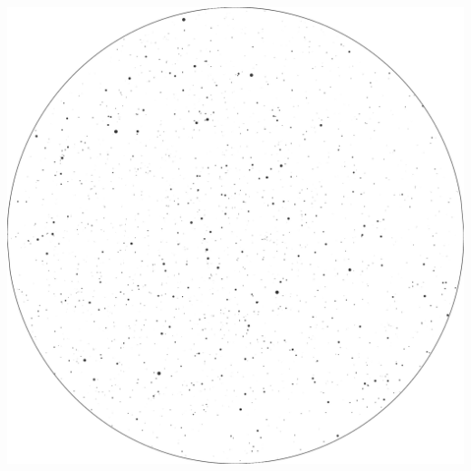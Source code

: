 \documentclass{./SAS-class-skygen}
\begin{document}
	\vspace{0.5cm}
    \begin{center}
    \includegraphics[width=\textwidth]{./pics/skychart26.png}
    \end{center}
    
    
\end{document}

